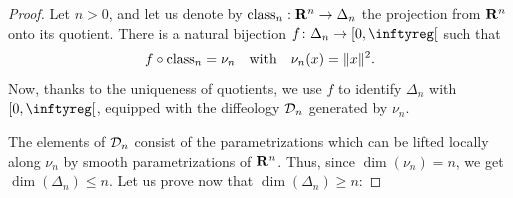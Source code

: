 \begin{proof} Let $n>0$,
  and let us denote by $\operatorname{class}_n : \mathbf{R}^n \to \Delta_n$ the projection from $\mathbf{R}^n$ onto its quotient.
  There is a natural bijection $f \colon \Delta_n \to \LeftClosedInterval{0,\infty}$ such that
  $$%
    f \circ \Class_n = \nu_n
    \quad \text{with} \quad
    \nu_n(x) = \Norm{x}^2.
    $$%
  Now, thanks to the uniqueness of quotients,
  we use $f$ to identify $\Delta_n$ with $\LeftClosedInterval{0,\infty}$,
  equipped with the diffeology $\mathcal{D}_n$ generated by $\nu_n$.
  \begin{center}
  \end{center}
  The elements of $\mathcal{D}_n$ consist of the parametrizations which can be lifted locally along $\nu_n$ by smooth parametrizations of $\mathbf{R}^n$.
  Thus,
  since $\dim(\nu_n) = n$,
  we get $\dim(\Delta_n) \leq n$.
  Let us prove now that $\dim(\Delta_n) \geq n$:
  

\end{proof}
